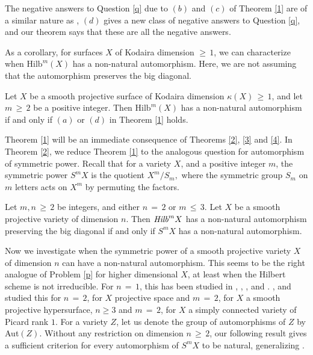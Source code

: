 \documentclass[12pt,reqno]{amsart}
\newenvironment{manualtheorem}[1]{%
\renewcommand\themanualtheoreminner{#1}%
  \manualtheoreminner
}{\endmanualtheoreminner}
\newenvironment{manualcorollary}[1]{%
  \renewcommand\themanualcorollaryinner{#1}%
  \manualcorollaryinner
}{\endmanualcorollaryinner}
\theoremstyle{definition}
\numberwithin{equation}{section}
\begin{document}
The negative answers to Question \ref{q} due to $(b)$ and $(c)$ of Theorem \ref{1} are of a similar nature as \cite{Sas}, $(d)$ gives a new class of negative answers to Question \ref{q}, and our theorem says that these are all the negative answers.

As a corollary, for surfaces $X$ of Kodaira dimension $\geq\, 1$, we can characterize when $\textrm{Hilb}^{m}(X)$ has a non-natural automorphism. Here, we are not assuming that the automorphism preserves the big diagonal.

\begin{manualcorollary}{A}\label{c1}
    Let $X$ be a smooth projective surface of Kodaira dimension $\kappa(X)\,\geq\, 1$, and let $m\,\geq\, 2$ be a positive integer. Then $\textrm{Hilb}^{m}(X)$ has a non-natural automorphism if and only if $(a)$ or $(d)$ in Theorem \ref{1} holds.
\end{manualcorollary}


Theorem \ref{1} will be an immediate consequence of Theorems \ref{2}, \ref{3} and \ref{4}. In Theorem \ref{2}, we reduce Theorem \ref{1} to the analogous question for automorphism of symmetric power. Recall that for a variety $X$, and a positive integer $m$, the symmetric power $S^mX$ is the quotient $X^m/S_m,$ where the symmetric group $S_m$ on $m$ letters acts on $X^m$ by permuting the factors. 

\begin{manualtheorem}{B}\label{2}
    Let $m,n\,\geq\,2$ be integers, and either $n\,=\,2$ or $m\,\leq\, 3.$ Let $X$ be a smooth projective variety of dimension $n$. Then $\emph{Hilb}^{m}X$ has a non-natural automorphism preserving the big diagonal if and only if $S^{m}X$ has a non-natural automorphism.
\end{manualtheorem}


Now we investigate when the symmetric power of a smooth projective variety $X$ of dimension $n$ can have a non-natural automorphism. This seems to be the right analogue of Problem \ref{p} for higher dimensional $X$, at least when the Hilbert scheme is not irreducible. For $n\,=\,1$, this has been studied in \cite{ciliberto1993symmetric}, \cite{ciliberto1995singularities}, \cite{martens1965extended}, \cite{weil2009beweis} and \cite{biswas2017automorphisms}. \cite{belmans2020automorphisms}, \cite{Ha} and \cite{Og} studied this for $n\,=\,2$,  \cite{belmans2020automorphisms} for $X$ projective space and $m\,=\,2$, \cite{Wa} for $X$ a smooth projective hypersurface, $n\geq 3$ and $m\,=\,2$, {\cite[Theorem 3.1.1]{Sh}} for $X$ a simply connected variety of Picard rank $1$. For a variety $Z$, let us denote the group of automorphisms of $Z$ by Aut$(Z)$. Without any restriction on dimension $n\,\geq\, 2$, our following result gives a sufficient criterion for every automorphism of $S^m X$ to be natural, generalizing {\cite[Theorem 2.7]{Ha}}.
\end{document}
